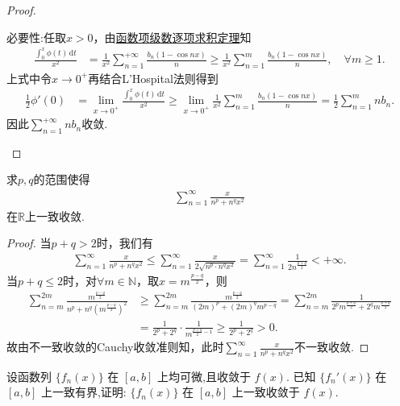 \documentclass[../../main.tex]{subfiles}%
\begin{document}
\begin{proof}
\begin{enumerate}
{\heiti 必要性:}任取\( x > 0 \)，由\hyperref[theorem:函数项级数逐项求积定理]{函数项级数逐项求积定理}知
\begin{align*}
\frac{\int_{0}^{x} \phi(t) \, \mathrm{d}t}{x^2} &= \frac{1}{x^2} \sum_{n=1}^{+\infty} \frac{b_n (1 - \cos nx)}{n} \geqslant \frac{1}{x^2} \sum_{n=1}^{m} \frac{b_n (1 - \cos nx)}{n}, \quad \forall m \geqslant 1.
\end{align*}
上式中令\( x \to 0^+ \)再结合L'Hospital法则得到
\begin{align*}
\frac{1}{2} \phi'(0) &= \lim_{x \to 0^+} \frac{\int_{0}^{x} \phi(t) \, \mathrm{d}t}{x^2} \geqslant \lim_{x \to 0^+} \frac{1}{x^2} \sum_{n=1}^{m} \frac{b_n (1 - \cos nx)}{n} = \frac{1}{2} \sum_{n=1}^{m} nb_n.
\end{align*}
因此\( \sum_{n=1}^{+\infty} nb_n \)收敛.
\end{enumerate}
\end{proof}

\begin{example}
求$p,q$的范围使得
\begin{align*}
\sum_{n=1}^{\infty} \frac{x}{n^p + n^q x^2}
\end{align*}
在$\mathbb{R}$上一致收敛.
\end{example}
\begin{proof}
当$p+q>2$时，我们有
\begin{align*}
\sum_{n=1}^{\infty}{\frac{x}{n^p+n^qx^2}}\leqslant \sum_{n=1}^{\infty}{\frac{x}{2\sqrt{n^p\cdot n^qx^2}}}=\sum_{n=1}^{\infty}{\frac{1}{2n^{\frac{p+q}{2}}}}<+\infty .
\end{align*}
当$p+q\leqslant 2$时，对$\forall m\in \mathbb{N}$，取$x=m^{\frac{p-q}{2}}$，则
\begin{align*}
\sum_{n=m}^{2m}{\frac{m^{\frac{p-q}{2}}}{n^p+n^q\left( m^{\frac{p-q}{2}} \right) ^2}}&\geqslant \sum_{n=m}^{2m}{\frac{m^{\frac{p-q}{2}}}{\left( 2m \right) ^p+\left( 2m \right) ^qm^{p-q}}}=\sum_{n=m}^{2m}{\frac{1}{2^pm^{\frac{p+q}{2}}+2^qm^{\frac{p+q}{2}}}}
\\
&=\frac{1}{2^p+2^q}\cdot \frac{1}{m^{\frac{p+q}{2}-1}}\geqslant \frac{1}{2^p+2^q}>0.
\end{align*}
故由不一致收敛的Cauchy收敛准则知，此时$\sum_{n=1}^{\infty}{\frac{x}{n^p+n^qx^2}}$不一致收敛.
\end{proof}

\begin{example}
设函数列 \(\{f_n(x)\}\) 在 \([a,b]\) 上均可微,且收敛于 \(f(x)\). 已知 \(\{f_n'(x)\}\) 在 \([a,b]\) 上一致有界,证明: \(\{f_n(x)\}\) 在 \([a,b]\) 上一致收敛于 \(f(x)\).
\end{example}
\end{document}
